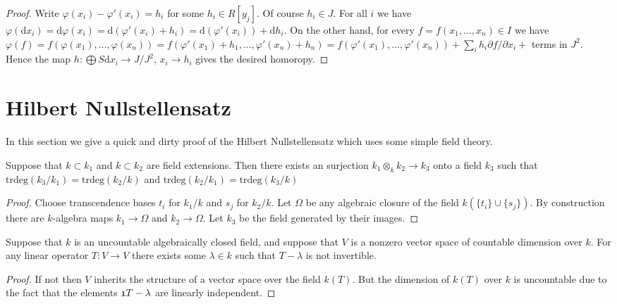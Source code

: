 \begin{proof}
\medskip\noindent
Write $\varphi(x_i) - \varphi'(x_i) = h_i$ for some
$h_i \in R[y_j]$. Of course $h_i \in J$. For all $i$ we have
$\varphi(\text{d}x_i) = \text{d}\varphi(x_i)
=\text{d}(\varphi'(x_i) + h_i) =
\text{d}(\varphi'(x_i)) + \text{d}h_i$. On the other hand,
for every $f = f(x_1,\ldots,x_n) \in I$ we have $\varphi(f) = 
f(\varphi(x_1),\ldots, \varphi(x_n)) =
f(\varphi'(x_1) + h_1,\ldots, \varphi'(x_n) + h_n) =
f(\varphi'(x_1),\ldots, \varphi'(x_n)) + 
\sum_i h_i \partial f/\partial x_i + $ terms in 
$J^2$. Hence the map $h : \bigoplus S\text{d}x_i \to J/J^2$,
$x_i \to h_i$ gives the desired homoropy.
\end{proof}

\section{Hilbert Nullstellensatz}
\label{section-nullstellensatz}

\noindent
In this section we give a quick and dirty proof
of the Hilbert Nullstellensatz which uses some
simple field theory.

\begin{lemma}
\label{lemma-tensor-fields}
Suppose that $k \subset k_1$ and $k\subset k_2$ are
field extensions. Then there exists an surjection
$k_1\otimes_k k_2 \to k_3$ onto a field $k_3$ such
that $\text{trdeg}(k_3/k_1) = \text{trdeg}(k_2/k)$
and  $\text{trdeg}(k_2/k_1) = \text{trdeg}(k_3/k)$
\end{lemma}

\begin{proof}
Choose transcendence bases $t_i$ for $k_1/k$ and
$s_j$ for $k_2/k$. Let $\Omega$ be any algebraic closure
of the field $k(\{t_i\}\cup \{s_j\})$. By construction
there are $k$-algebra maps $k_1 \to \Omega$ and
$k_2 \to \Omega$. Let $k_3$ be the field generated
by their images.
\end{proof}

\begin{lemma}
\label{lemma-dimension}
Suppose that $k$ is an uncountable algebraically closed field,
and suppose that $V$ is a nonzero vector space of countable dimension
over $k$. For any linear operator $T : V \to V$ there exists
some $\lambda \in k$ such that $T - \lambda$ is not invertible.
\end{lemma}

\begin{proof}
If not then $V$ inherits the structure of a vector space over
the field $k(T)$. But the dimension of $k(T)$ over $k$ is
uncountable due to the fact that the elements $\frak{1}{T - \lambda}$
are linearly independent.
\end{proof}

